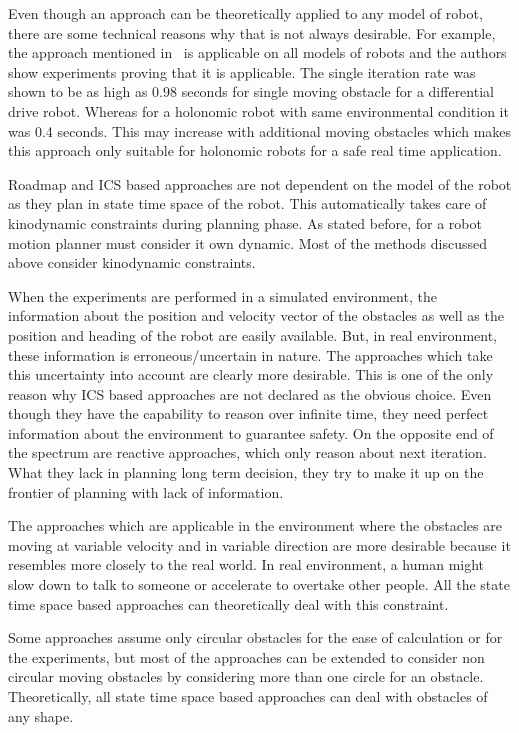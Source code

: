 Even though an approach can be theoretically applied to any model of robot, there are some
technical reasons why that is not always desirable. For example, the approach mentioned 
in~\cite{mercy2017spline} is applicable on all models of robots and the authors show experiments
proving that it is applicable. The single iteration rate was shown to be as high as 0.98 
seconds for single moving obstacle for a differential drive robot. Whereas for a holonomic
robot with same environmental condition it was 0.4 seconds. This may increase with 
additional moving obstacles which makes this approach only suitable for holonomic robots
for a safe real time application. 

Roadmap and ICS based approaches are not dependent on the model of the robot as they 
plan in state time space of the robot. This automatically takes care of kinodynamic 
constraints during planning phase.
As stated before, for a robot motion planner must consider it own dynamic\cite{fraichard2007short}. 
Most of the methods discussed above consider kinodynamic constraints.

When the experiments are performed in a simulated environment, the information about 
the position and velocity vector of the obstacles as well as the position and heading of 
the robot are easily available. But, in real environment, these information is 
erroneous/uncertain in nature. The approaches which take this uncertainty into account are 
clearly more desirable. 
This is one of the only reason why ICS based approaches are not declared as the obvious 
choice. Even though they have the capability to reason over infinite time, they need 
perfect information about the environment to guarantee safety. On the opposite end of the 
spectrum are reactive approaches, which only reason about next iteration. What they lack 
in planning long term decision, they try to make it up on the frontier of planning with lack 
of information.

The approaches which are applicable in the environment where the obstacles are moving 
at variable velocity and in variable direction are more desirable because it resembles more 
closely to the real world. In real environment, a human might slow down to talk to someone 
or accelerate to overtake other people. All the state time space based approaches can 
theoretically deal with this constraint.

Some approaches assume only circular obstacles for the ease of calculation or for the 
experiments, but most of the approaches can be extended to consider non circular moving 
obstacles by considering more than one circle for an obstacle\cite{large2005navigation}. 
Theoretically, all state time space based approaches can deal with obstacles of any shape.

